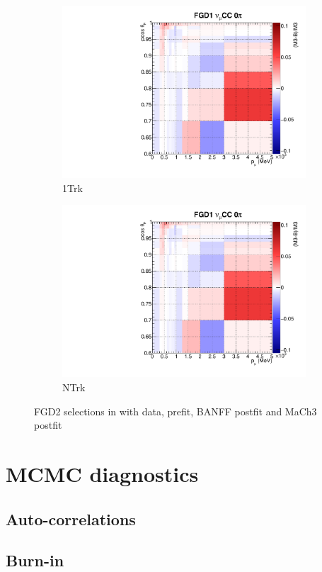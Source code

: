 \begin{figure}
\begin{subfigure}[t]{0.24\textwidth}
		\includegraphics[width=\textwidth, trim={0mm 0mm 10mm 7mm}, clip, page=39]{figures/mach3/banff/postfit_comp}
		\caption{\numu 1Trk}
	\end{subfigure}
	\begin{subfigure}[t]{0.24\textwidth}
		\includegraphics[width=\textwidth, trim={0mm 0mm 10mm 7mm}, clip, page=42]{figures/mach3/banff/postfit_comp}
		\caption{\numu NTrk}
	\end{subfigure}
	\caption{FGD2 selections in \pmu with data, prefit, BANFF postfit and MaCh3 postfit}
	\label{fig:mach3_banff_postfit_fgd2}
\end{figure}



\chapter{MCMC diagnostics}
\section{Auto-correlations}
\section{Burn-in}